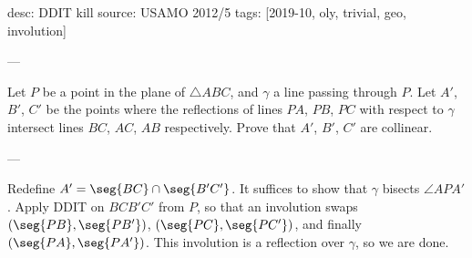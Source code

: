 desc: DDIT kill
source: USAMO 2012/5
tags: [2019-10, oly, trivial, geo, involution]

---

Let $P$ be a point in the plane of $\triangle ABC$, and $\gamma$ a line passing through $P$. Let $A'$, $B'$, $C'$ be the points where the reflections of lines $PA$, $PB$, $PC$ with respect to $\gamma$ intersect lines $BC$, $AC$, $AB$ respectively. Prove that $A'$, $B'$, $C'$ are collinear.

---

Redefine $A'=\seg{BC}\cap\seg{B'C'}$. It suffices to show that $\gamma$ bisects $\angle APA'$. Apply DDIT on $BCB'C'$ from $P$, so that an involution swaps $(\seg{PB},\seg{PB'})$, $(\seg{PC},\seg{PC'})$, and finally $(\seg{PA},\seg{PA'})$. This involution is a reflection over $\gamma$, so we are done.
